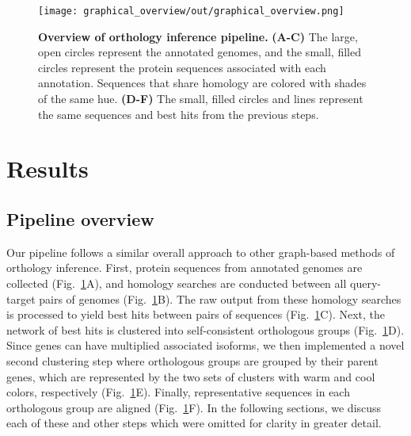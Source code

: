 \begin{figure}[h!]
\texttt{[image: graphical\_overview/out/graphical\_overview.png]}
\centering
\caption{\textbf{Overview of orthology inference pipeline.}
\textbf{(A-C)} The large, open circles represent the annotated genomes, and the small, filled circles represent the protein sequences associated with each annotation. Sequences that share homology are colored with shades of the same hue. \textbf{(D-F)} The small, filled circles and lines represent the same sequences and best hits from the previous steps.}
\label{fig:graphical_overview}
\end{figure}

\section{Results}
\subsection{Pipeline overview}
Our pipeline follows a similar overall approach to other graph-based methods of orthology inference. First, protein sequences from annotated genomes are collected (Fig.~\ref{fig:graphical_overview}A), and homology searches are conducted between all query-target pairs of genomes (Fig.~\ref{fig:graphical_overview}B). The raw output from these homology searches is processed to yield best hits between pairs of sequences (Fig.~\ref{fig:graphical_overview}C). Next, the network of best hits is clustered into self-consistent orthologous groups (Fig.~\ref{fig:graphical_overview}D). Since genes can have multiplied associated isoforms, we then implemented a novel second clustering step where orthologous groups are grouped by their parent genes, which are represented by the two sets of clusters with warm and cool colors, respectively (Fig.~\ref{fig:graphical_overview}E). Finally, representative sequences in each orthologous group are aligned (Fig.~\ref{fig:graphical_overview}F). In the following sections, we discuss each of these and other steps which were omitted for clarity in greater detail.

